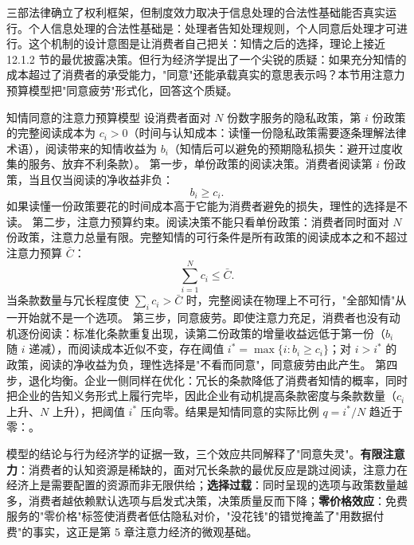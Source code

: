 三部法律确立了权利框架，但制度效力取决于信息处理的合法性基础能否真实运行。个人信息处理的合法性基础是：处理者告知处理规则，个人同意后处理才可进行。这个机制的设计意图是让消费者自己把关：知情之后的选择，理论上接近 12.1.2 节的最优披露决策。但行为经济学提出了一个尖锐的质疑：如果充分知情的成本超过了消费者的承受能力，"同意"还能承载真实的意思表示吗？本节用注意力预算模型把"同意疲劳"形式化，回答这个质疑。

\begin{derivation}{知情同意的注意力预算模型}{}
设消费者面对 $N$ 份数字服务的隐私政策，第 $i$ 份政策的完整阅读成本为 $c_i > 0$（时间与认知成本：读懂一份隐私政策需要逐条理解法律术语），阅读带来的知情收益为 $b_i$（知情后可以避免的预期隐私损失：避开过度收集的服务、放弃不利条款）。
第一步，单份政策的阅读决策。消费者阅读第 $i$ 份政策，当且仅当阅读的净收益非负：
\[
b_i \ge c_i.
\]
如果读懂一份政策要花的时间成本高于它能为消费者避免的损失，理性的选择是不读。
第二步，注意力预算约束。阅读决策不能只看单份政策：消费者同时面对 $N$ 份政策，注意力总量有限。完整知情的可行条件是所有政策的阅读成本之和不超过注意力预算 $\bar{C}$：
\[
\sum_{i=1}^{N} c_i \le \bar{C}.
\]
当条款数量与冗长程度使 $\sum_i c_i > \bar{C}$ 时，完整阅读在物理上不可行，"全部知情"从一开始就不是一个选项。
第三步，同意疲劳。即使注意力充足，消费者也没有动机逐份阅读：标准化条款重复出现，读第二份政策的增量收益远低于第一份（$b_i$ 随 $i$ 递减），而阅读成本近似不变，存在阈值 $i^* = \max\{i : b_i \ge c_i\}$；对 $i > i^*$ 的政策，阅读的净收益为负，理性选择是"不看而同意"，同意疲劳由此产生。
第四步，退化均衡。企业一侧同样在优化：冗长的条款降低了消费者知情的概率，同时把企业的告知义务形式上履行完毕，因此企业有动机提高条款密度与条款数量（$c_i$ 上升、$N$ 上升），把阈值 $i^*$ 压向零。结果是知情同意的实际比例 $q = i^*/N$ 趋近于零：。
\end{derivation}

模型的结论与行为经济学的证据一致，三个效应共同解释了"同意失灵"。\textbf{有限注意力}：消费者的认知资源是稀缺的，面对冗长条款的最优反应是跳过阅读，注意力在经济上是需要配置的资源而非无限供给；\textbf{选择过载}：同时呈现的选项与政策数量越多，消费者越依赖默认选项与启发式决策，决策质量反而下降；\textbf{零价格效应}：免费服务的"零价格"标签使消费者低估隐私对价，"没花钱"的错觉掩盖了"用数据付费"的事实，这正是第 5 章注意力经济的微观基础。

